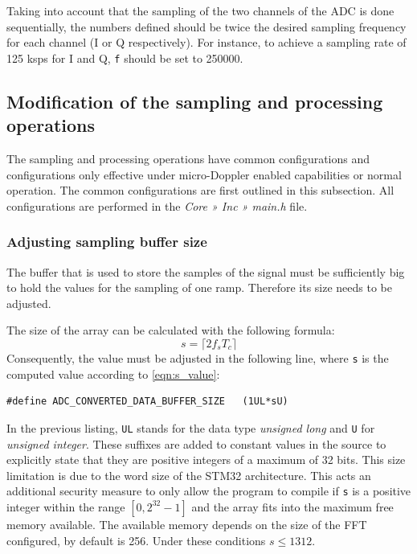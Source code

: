 Taking into account that the sampling of the two channels of the ADC is done sequentially, the numbers defined should be twice the desired sampling frequency for each channel (I or Q respectively). For instance, to achieve a sampling rate of 125 ksps for I and Q, \texttt{f} should be set to 250000.


\subsection{Modification of the sampling and processing operations}

The sampling and processing operations have common configurations and configurations only effective under micro-Doppler enabled capabilities or normal operation. The common configurations are first outlined in this subsection. All configurations are performed in the \textit{Core » Inc » main.h} file.

\subsubsection{Adjusting sampling buffer size}

The buffer that is used to store the samples of the signal must be sufficiently big to hold the values for the sampling of one ramp. Therefore its size needs to be adjusted.

The size of the array can be calculated with the following formula:
\begin{equation} \label{eqn:s_value}
	s = \lceil 2 f_s T_c \rceil
\end{equation}
Consequently, the value must be adjusted in the following line, where \texttt{s} is the computed value according to \cref{eqn:s_value}:
\begin{verbatim}
#define ADC_CONVERTED_DATA_BUFFER_SIZE   (1UL*sU)
\end{verbatim}

In the previous listing, \texttt{UL} stands for the data type \textit{unsigned long} and \texttt{U} for \textit{unsigned integer}. These suffixes are added to constant values in the source to explicitly state that they are positive integers of a maximum of 32 bits. This size limitation is due to the word size of the STM32 architecture. This acts an additional security measure to only allow the program to compile if \texttt{s} is a positive integer within the range $[0, 2^{32} - 1]$ and the array fits into the maximum free memory available. The available memory depends on the size of the FFT configured, by default is 256. Under these conditions $s \le 1312$.

